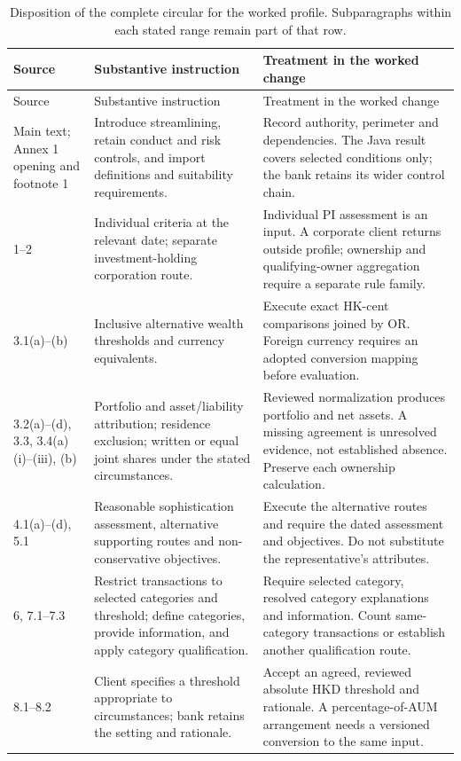 \documentclass[12pt,a4paper,oneside,openany]{book}
\begin{document}
\begingroup\small
\begin{longtable}{P{0.14\textwidth}P{0.37\textwidth}P{0.39\textwidth}}
\caption{Disposition of the complete circular for the worked profile. Subparagraphs
within each stated range remain part of that row.}\label{tab:circular-inventory}\\
\toprule Source & Substantive instruction & Treatment in the worked change \\\midrule
\endfirsthead
\toprule Source & Substantive instruction & Treatment in the worked change \\\midrule
\endhead
Main text; Annex 1 opening and footnote 1 & Introduce streamlining, retain conduct and risk controls, and import definitions and suitability requirements. & Record authority, perimeter and dependencies. The Java result covers selected conditions only; the bank retains its wider control chain.\\
1--2 & Individual criteria at the relevant date; separate investment-holding corporation route. & Individual PI assessment is an input. A corporate client returns outside profile; ownership and qualifying-owner aggregation require a separate rule family.\\
3.1(a)--(b) & Inclusive alternative wealth thresholds and currency equivalents. & Execute exact HK-cent comparisons joined by OR. Foreign currency requires an adopted conversion mapping before evaluation.\\
3.2(a)--(d), 3.3, 3.4(a)(i)--(iii), (b) & Portfolio and asset/liability attribution; residence exclusion; written or equal joint shares under the stated circumstances. & Reviewed normalization produces portfolio and net assets. A missing agreement is unresolved evidence, not established absence. Preserve each ownership calculation.\\
4.1(a)--(d), 5.1 & Reasonable sophistication assessment, alternative supporting routes and non-conservative objectives. & Execute the alternative routes and require the dated assessment and objectives. Do not substitute the representative's attributes.\\
6, 7.1--7.3 & Restrict transactions to selected categories and threshold; define categories, provide information, and apply category qualification. & Require selected category, resolved category explanations and information. Count same-category transactions or establish another qualification route.\\
8.1--8.2 & Client specifies a threshold appropriate to circumstances; bank retains the setting and rationale. & Accept an agreed, reviewed absolute HKD threshold and rationale. A percentage-of-AUM arrangement needs a versioned conversion to the same input.\\

\end{longtable}
\end{document}
